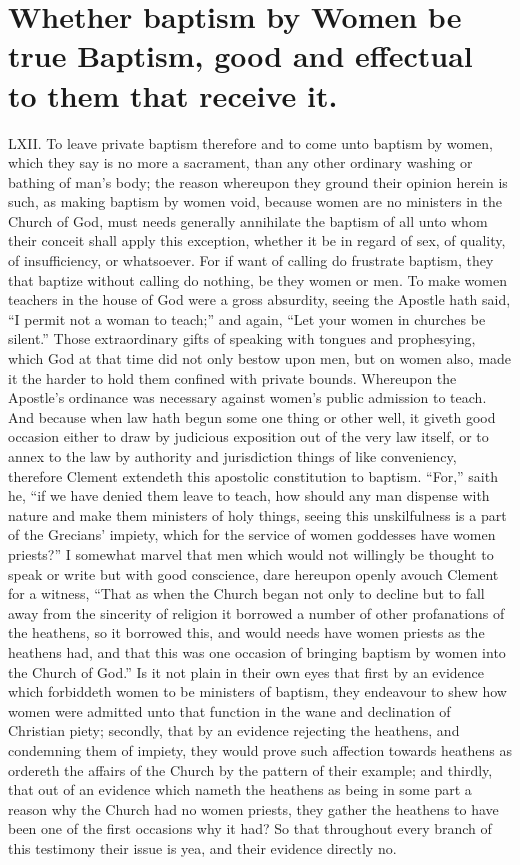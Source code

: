 \section*{Whether baptism by Women be true Baptism, good and effectual to them that receive it.}
LXII. To leave private baptism therefore and to come unto baptism by women, which they say is no more a  sacrament, than any other ordinary washing or bathing of man’s body; the reason whereupon they ground their opinion herein is such, as making baptism by women void, because women are no ministers in the Church of God, must needs generally annihilate the baptism of all unto whom their conceit shall apply this exception, whether it be in regard of sex, of quality, of insufficiency, or whatsoever. For if want of calling do frustrate baptism, they that baptize without calling do nothing, be they women or men.
To make women teachers in the house of God were a gross absurdity, seeing the Apostle hath said, “I permit not a woman to teach;” and again, “Let your women in churches be silent.” Those extraordinary gifts of speaking with tongues and prophesying, which God at that time did not only bestow upon men, but on women also, made it the harder to hold them confined with private bounds. Whereupon the Apostle’s ordinance was necessary against women’s public admission to teach. And because when law hath begun some one thing or other well, it giveth good occasion either to draw by judicious exposition out of the very law itself, or to annex to the law by authority and jurisdiction things of like conveniency, therefore Clement extendeth this apostolic constitution to baptism. “For,” saith he, “if we have denied  them leave to teach, how should any man dispense with nature and make them ministers of holy things, seeing this unskilfulness is a part of the Grecians’ impiety, which for the service of women goddesses have women priests?”
I somewhat marvel that men which would not willingly be thought to speak or write but with good conscience, dare hereupon openly avouch Clement for a witness, “That as when the Church began not only to decline but to fall away from the sincerity of religion it borrowed a number of other profanations of the heathens, so it borrowed this, and would needs have women priests as the heathens had, and that this was one occasion of bringing baptism by women into the Church of God.” Is it not plain in their own eyes that first by an evidence which forbiddeth women to be ministers of baptism, they endeavour to shew how women were admitted unto that function in the wane and declination of Christian piety; secondly, that by an evidence rejecting the heathens, and condemning them of impiety, they would prove such affection towards heathens as ordereth the affairs of the Church by the pattern of their example; and thirdly, that out of an evidence which nameth the heathens as being in some part a reason why the Church had no women priests, they gather the heathens to have been one of the first occasions why it had? So that throughout every branch of this testimony their issue is yea, and their evidence directly no.
